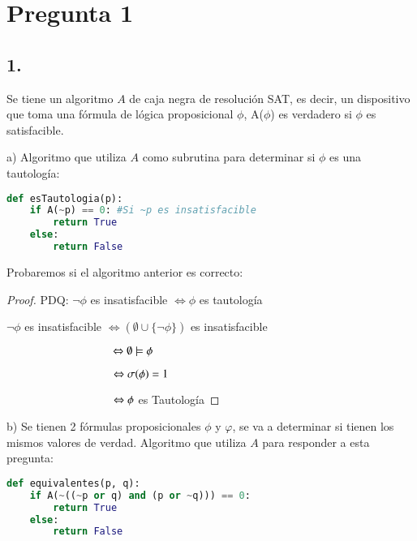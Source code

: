 \documentclass[
	spanish, %
	letterpaper, oneside
]{article}
\begin{document}
\templatePortrait

\templatePagecfg

\templateFinalcfg


\section*{Pregunta 1}
\subsection*{1.}
Se tiene un  algoritmo $A$ de caja negra de resolución SAT, es decir, un dispositivo que toma una fórmula de lógica proposicional $\phi$, A($\phi$) es verdadero si $\phi$ es satisfacible.


a) Algoritmo que utiliza $A$ como subrutina para determinar si $\phi$ es una tautología:

\begin{lstlisting}[language=Python]
def esTautologia(p):
    if A(~p) == 0: #Si ~p es insatisfacible
        return True
    else:
        return False
\end{lstlisting}
Probaremos si el algoritmo anterior es correcto:
\begin{proof}

    PDQ: $\neg \phi$ es insatisfacible $\Leftrightarrow \phi$ es tautología
    
    $\neg \phi$ es insatisfacible $\Leftrightarrow (\emptyset \cup \{\neg \phi\})$ es insatisfacible
    
    $\hspace{33mm} \Leftrightarrow \emptyset \models \phi$

    $\hspace{33mm} \Leftrightarrow \sigma(\phi) = 1$

    $\hspace{33mm} \Leftrightarrow \phi$ es Tautología
\end{proof}

b) Se tienen 2 fórmulas proposicionales $\phi$ y $\varphi$, se va a determinar si tienen los mismos valores de verdad. Algoritmo que utiliza $A$ para responder a esta pregunta:

\begin{lstlisting}[language=Python]
def equivalentes(p, q):
    if A(~((~p or q) and (p or ~q))) == 0:
        return True
    else:
        return False
\end{lstlisting}
\end{document}
